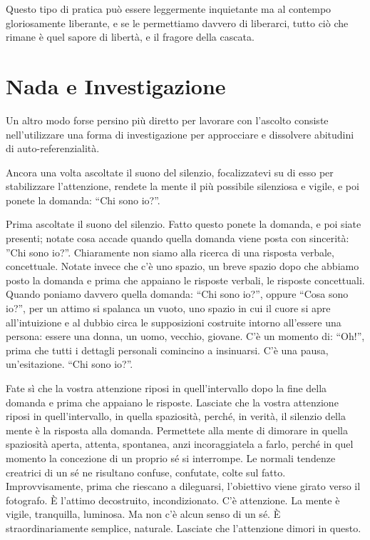 Questo tipo di pratica può essere leggermente inquietante ma al contempo
gloriosamente liberante, e se le permettiamo davvero di liberarci, tutto
ciò che rimane è quel sapore di libertà, e il fragore della cascata.

\section{Nada e Investigazione}

Un altro modo forse persino più diretto per lavorare con l'ascolto
consiste nell'utilizzare una forma di investigazione per approcciare e
dissolvere abitudini di auto-referenzialità.

Ancora una volta ascoltate il suono del silenzio, focalizzatevi su di
esso per stabilizzare l'attenzione, rendete la mente il più possibile
silenziosa e vigile, e poi ponete la domanda: ``Chi sono io?''.

Prima ascoltate il suono del silenzio. Fatto questo ponete la domanda, e
poi siate presenti; notate cosa accade quando quella domanda viene posta
con sincerità: ''Chi sono io?''. Chiaramente non siamo alla ricerca di
una risposta verbale, concettuale. Notate invece che c'è uno spazio, un
breve spazio dopo che abbiamo posto la domanda e prima che appaiano le
risposte verbali, le risposte concettuali. Quando poniamo davvero quella
domanda: ``Chi sono io?'', oppure ``Cosa sono io?'', per un attimo si
spalanca un vuoto, uno spazio in cui il cuore si apre all'intuizione e
al dubbio circa le supposizioni costruite intorno all'essere una
persona: essere una donna, un uomo, vecchio, giovane. C'è un momento di:
``Oh!'', prima che tutti i dettagli personali comincino a insinuarsi.
C'è una pausa, un'esitazione. ``Chi sono io?''.

Fate sì che la vostra attenzione riposi in quell'intervallo dopo la fine
della domanda e prima che appaiano le risposte. Lasciate che la vostra
attenzione riposi in quell'intervallo, in quella spaziosità, perché, in
verità, il silenzio della mente è la risposta alla domanda. Permettete
alla mente di dimorare in quella spaziosità aperta, attenta, spontanea,
anzi incoraggiatela a farlo, perché in quel momento la concezione di un
proprio sé si interrompe. Le normali tendenze creatrici di un sé ne
risultano confuse, confutate, colte sul fatto. Improvvisamente, prima
che riescano a dileguarsi, l'obiettivo viene girato verso il fotografo.
È l'attimo decostruito, incondizionato. C'è attenzione. La mente è
vigile, tranquilla, luminosa. Ma non c'è alcun senso di un sé. È
straordinariamente semplice, naturale. Lasciate che l'attenzione dimori
in questo.

